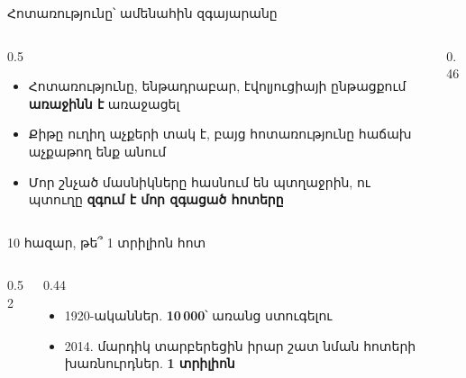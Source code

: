 \begin{frame}{Հոտառությունը՝ ամենահին զգայարանը}
  \begin{columns}[T]
    \begin{column}{0.5\textwidth}
      \begin{itemize}
        \item Հոտառությունը, ենթադրաբար, էվոլյուցիայի ընթացքում \textbf{առաջինն է} առաջացել
        \item Քիթը ուղիղ աչքերի տակ է, բայց հոտառությունը հաճախ աչքաթող ենք անում
        \item<2-> Մոր շնչած մասնիկները հասնում են պտղաջրին, ու պտուղը \textbf{զգում է մոր զգացած հոտերը}
      \end{itemize}
    \end{column}
    \begin{column}{0.46\textwidth}
    \end{column}
  \end{columns}
\end{frame}

\begin{frame}{10 հազար, թե՞ 1 տրիլիոն հոտ}
  \begin{columns}[T]
    \begin{column}{0.52\textwidth}
      \centering
      \par\medskip
    \end{column}
    \begin{column}{0.44\textwidth}
      \begin{itemize}
        \item 1920-ականներ. \textbf{10\,000}՝ առանց ստուգելու
        \item<2-> 2014. մարդիկ տարբերեցին իրար շատ նման հոտերի խառնուրդներ. \textbf{1 տրիլիոն}
      \end{itemize}
    \end{column}
  \end{columns}
\end{frame}

